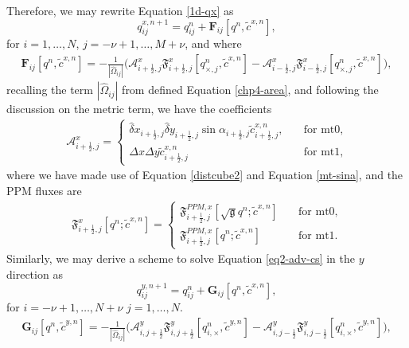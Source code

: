 Therefore, we may rewrite Equation \eqref{1d-qx} as
\begin{equation}
q^{x,n+1}_{ij} = q^{n}_{ij} + \mathbf{F}_{ij}[{q^n,\tilde{c}^{x,n}}],
\end{equation}
for $i=1, \ldots, N$, $j=-\nu+1, \ldots, M + \nu$, and where
\begin{align*}
	\mathbf{F}_{ij}[{q^n,\tilde{c}^{x,n}}] = 
	-\frac{1}{|\hat{\Omega}_{ij}|}
	\bigg(\mathcal{A}_{i+\frac{1}{2},j}^{x} \mathfrak{F}_{i+\frac{1}{2},j}^{x}[q^n_{\times,j},\tilde{c}^{x,n}]-
	\mathcal{A}_{i-\frac{1}{2},j}^{x} \mathfrak{F}_{i-\frac{1}{2},j}^{x}[q^n_{\times,j},\tilde{c}^{x,n}] \bigg),
\end{align*}
recalling the term $|\hat{\Omega}_{ij}|$ from defined Equation \eqref{chp4-area},
and following the discussion on the metric term, we have the coefficients
\begin{align}
	\mathcal{A}_{i+\frac{1}{2},j}^x= 
	\begin{cases}
		\hat{\delta} x_{i+\frac{1}{2},j}  \hat{\delta} y_{i+\frac{1}{2},j} 
		\sin{\alpha_{i+\frac{1}{2},j}}
		{\tilde{c}}_{i+\frac{1}{2},j}^{x,n},
		\quad &\text{for mt0},\\
		{\Delta x}{\Delta y}{\tilde{c}}_{i+\frac{1}{2},j}^{x,n}
		\quad &\text{for mt1},
	\end{cases}
\end{align}
where we have made use of Equation \eqref{distcube2} and Equation \eqref{mt-sina}, 
and the PPM fluxes are
\begin{align}
	\mathfrak{F}_{i+\frac{1}{2},j}^x [{{q}^n;\tilde{c}^{x,n}}] = 
	\begin{cases}
		\mathfrak{F}_{i+\frac{1}{2},j}^{PPM,x}[{{\sqrt{\mathfrak{g}}q}^n;\tilde{c}^{x,n}}]
		\quad &\text{for mt0},\\
		\mathfrak{F}_{i+\frac{1}{2},j}^{PPM,x}[{{q}^n;\tilde{c}^{x,n}}]
		\quad &\text{for mt1}.
	\end{cases}
\end{align}
Similarly, we may derive a scheme to solve Equation \eqref{eq2-adv-cs} in the $y$ direction as
\begin{equation}
	q^{y,n+1}_{ij} = q^{n}_{ij} + \mathbf{G}_{ij}[{q^n,\tilde{c}^{x,n}}],
\end{equation}
for $i=-\nu+1, \ldots, N + \nu$  $j=1, \ldots, N$.
\begin{align*}
	\mathbf{G}_{ij}[{q^n,\tilde{c}^{y,n}}] = 
	-\frac{1}{|\hat{\Omega}_{ij}|}
	\bigg(\mathcal{A}_{i,j+\frac{1}{2}}^{y} \mathfrak{F}_{i,j+\frac{1}{2}}^{y}[q^n_{i,\times},\tilde{c}^{y,n}]-
	\mathcal{A}_{i,j-\frac{1}{2}}^{y} \mathfrak{F}_{i,j-\frac{1}{2}}^{y}[q^n_{i,\times},\tilde{c}^{y,n}] \bigg),
\end{align*}
